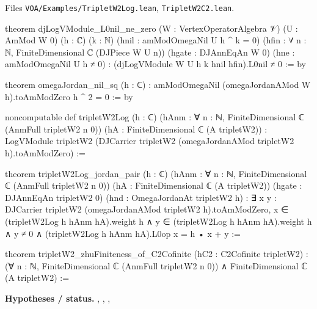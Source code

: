 \documentclass[11pt,openany]{book}
\newcommand{\lean}[1]{\texttt{\detokenize{#1}}}
\newcommand{\leanpath}[1]{\texttt{\small #1}}
\theoremstyle{definition}
\theoremstyle{plain}
\begin{document}
{\raggedright\noindent Files \leanpath{VOA/\allowbreak Examples/\allowbreak TripletW2Log.lean},
\leanpath{TripletW2C2.lean}.\par}
\begin{leancode}
theorem djLogVModule_L0nil_ne_zero (W : VertexOperatorAlgebra 𝒱) (U : AmMod W 0) (h : ℂ) (k : ℕ)
    (hnil : amModOmegaNil U h ^ k = 0)
    (hfin : ∀ n : ℕ, FiniteDimensional ℂ (DJPiece W U n))
    (hgate : DJAnnEqAn W 0) (hne : amModOmegaNil U h ≠ 0) :
    (djLogVModule W U h k hnil hfin).L0nil ≠ 0 := by

theorem omegaJordan_nil_sq (h : ℂ) :
    amModOmegaNil (omegaJordanAMod W h).toAmModZero h ^ 2 = 0 := by

noncomputable def tripletW2Log (h : ℂ)
    (hAnm : ∀ n : ℕ, FiniteDimensional ℂ (AnmFull tripletW2 n 0))
    (hA : FiniteDimensional ℂ (A tripletW2)) :
    LogVModule tripletW2
      (DJCarrier tripletW2 (omegaJordanAMod tripletW2 h).toAmModZero) :=

theorem tripletW2Log_jordan_pair (h : ℂ)
    (hAnm : ∀ n : ℕ, FiniteDimensional ℂ (AnmFull tripletW2 n 0))
    (hA : FiniteDimensional ℂ (A tripletW2)) (hgate : DJAnnEqAn tripletW2 0)
    (hnd : OmegaJordanAt tripletW2 h) :
    ∃ x y : DJCarrier tripletW2 (omegaJordanAMod tripletW2 h).toAmModZero,
      x ∈ (tripletW2Log h hAnm hA).weight h ∧ y ∈ (tripletW2Log h hAnm hA).weight h ∧
        y ≠ 0 ∧ (tripletW2Log h hAnm hA).L0op x = h • x + y :=
\end{leancode}
\begin{leancode}
theorem tripletW2_zhuFiniteness_of_C2Cofinite (hC2 : C2Cofinite tripletW2) :
    (∀ n : ℕ, FiniteDimensional ℂ (AnmFull tripletW2 n 0))
      ∧ FiniteDimensional ℂ (A tripletW2) :=
\end{leancode}
\noindent\textbf{Hypotheses / status.} \lean{hAnm}, \lean{hA}, \lean{hgate}, \lean{hnd}\par
\medskip
\endgroup
\setcounter{chapter}{18}
\end{document}
